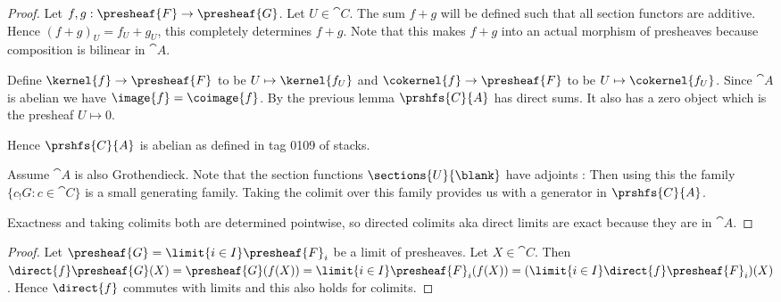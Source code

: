 \begin{proof}
Let $f,g:\presheaf{F} \rightarrow \presheaf{G}$. Let $U\in \cat{C}$.
The sum $f+g$ will be defined such that all section functors are additive. Hence $(f+g)_U =f_U+g_U$, this completely determines $f+g$. Note that this makes $f+g$ into an actual morphism of presheaves because composition is bilinear in $\cat{A}$.

Define $\kernel{f} \rightarrow \presheaf{F}$ to be $U \mapsto \kernel{f_U}$
and $\cokernel{f} \rightarrow \presheaf{F}$ to be $U \mapsto \cokernel{f_U}$.
Since $\cat{A}$ is abelian we have $\image{f} = \coimage{f}$.
By the previous lemma $\prshfs{C}{A}$ has direct sums. It also has a zero object which is the presheaf $U\mapsto 0$.

Hence $\prshfs{C}{A}$ is abelian as defined in tag 0109 of stacks.

Assume $\cat{A}$ is also Grothendieck. Note that the section functions $\sections{U}{\blank}$ have adjoints :
Then using this the family $\{c_!G: c\in \cat{C}\}$ is a small generating family. Taking the colimit over this family provides us with a generator in $\prshfs{C}{A}$.

Exactness and taking colimits both are determined pointwise, so directed colimits aka direct limits are exact because they are in $\cat{A}$.

\end{proof}



\begin{proof}
Let $\presheaf{G}=\limit{i\in I} \presheaf{F}_i$ be a limit of presheaves.
Let $X\in \cat{C}$. Then 
$\direct{f}\presheaf{G}(X) = \presheaf{G}(f(X)) = \limit{i\in I} \presheaf{F}_i(f(X)) = (\limit{i\in I} \direct{f}\presheaf{F}_i)(X)$. 
Hence $\direct{f}$ commutes with limits and this also holds for colimits.
\end{proof}

